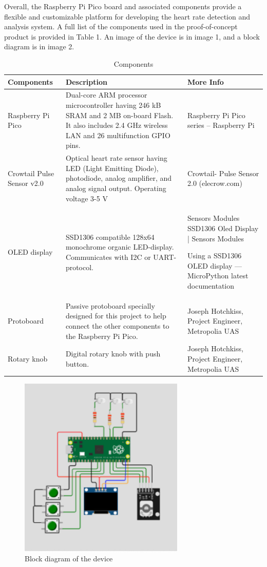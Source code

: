 \documentclass{article}
\begin{document}
Overall, the Raspberry Pi Pico board and associated components provide a flexible and customizable platform for developing the heart rate detection and analysis system. A full list of the components used in the proof-of-concept product is provided in Table 1. An image of the device is in image 1, and a block diagram is in image 2.


\begin{table}[h]
\centering
\begin{tabular}{|p{2cm}|p{5.5cm}|p{4cm}|}
\hline
\textbf{Components} & \textbf{Description} & \textbf{More Info} \\ \hline
Raspberry Pi Pico & Dual-core ARM processor microcontroller having 246 kB SRAM and 2 MB on-board Flash. It also includes 2.4 GHz wireless LAN and 26 multifunction GPIO pins.    & Raspberry Pi Pico series – Raspberry Pi    \\ \hline
Crowtail Pulse Sensor v2.0   & Optical heart rate sensor having LED (Light Emitting Diode), photodiode, analog amplifier, and analog signal output. Operating voltage 3-5 V  & Crowtail- Pulse Sensor 2.0 (elecrow.com)   \\ \hline
OLED display   & SSD1306 compatible 128x64 monochrome organic LED-display. Communicates with I2C or UART-protocol.    & Sensors Modules SSD1306 Oled Display | Sensors Modules

Using a SSD1306 OLED display — MicroPython latest documentation    \\ \hline
Protoboard   & Passive protoboard specially designed for this project to help connect the other components to the Raspberry Pi Pico.   & Joseph Hotchkiss, Project Engineer, Metropolia UAS   \\ \hline
Rotary knob  & Digital rotary knob with push button.    & Joseph Hotchkiss, Project Engineer, Metropolia UAS   \\ \hline
\end{tabular}
\caption{Components}
\label{table:version-history}
\end{table}



\begin{figure}[h]
  \centering
  \includegraphics[width=0.7\textwidth]{project_diagram.png}
  \caption{Block diagram of the device}
  \label{harrin}
\end{figure}
\end{document}
